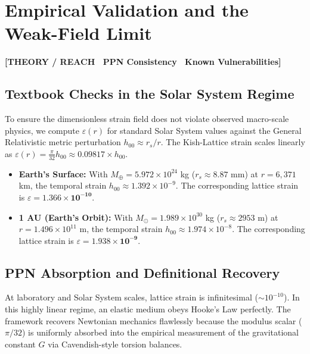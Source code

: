 \documentclass[11pt, letterpaper, openany]{book}
\begin{document}
\chapter{Empirical Validation and the Weak-Field Limit}

\begin{center}
{\color{theorytag}\textbf{[THEORY / REACH \textbullet\ PPN Consistency \textbullet\ Known Vulnerabilities]}}
\end{center}

\section{Textbook Checks in the Solar System Regime}

To ensure the dimensionless strain field does not violate observed macro-scale physics, we compute $\varepsilon(r)$ for standard Solar System values against the General Relativistic metric perturbation $h_{00} \approx r_s/r$. The Kish-Lattice strain scales linearly as $\varepsilon(r) = \frac{\pi}{32} h_{00} \approx 0.09817 \times h_{00}$.

\begin{itemize}
    \item \textbf{Earth's Surface:} With $M_{\oplus} = 5.972 \times 10^{24}$ kg ($r_s \approx 8.87$ mm) at $r = 6,371$ km, the temporal strain $h_{00} \approx 1.392 \times 10^{-9}$. The corresponding lattice strain is $\varepsilon = \mathbf{1.366 \times 10^{-10}}$.
    \item \textbf{1 AU (Earth's Orbit):} With $M_{\odot} = 1.989 \times 10^{30}$ kg ($r_s \approx 2953$ m) at $r = 1.496 \times 10^{11}$ m, the temporal strain $h_{00} \approx 1.974 \times 10^{-8}$. The corresponding lattice strain is $\varepsilon = \mathbf{1.938 \times 10^{-9}}$.
\end{itemize}

\section{PPN Absorption and Definitional Recovery}

At laboratory and Solar System scales, lattice strain is infinitesimal ($\sim 10^{-10}$). In this highly linear regime, an elastic medium obeys Hooke's Law perfectly. The framework recovers Newtonian mechanics flawlessly because the modulus scalar ($\pi/32$) is uniformly absorbed into the empirical measurement of the gravitational constant $G$ via Cavendish-style torsion balances.
\end{document}
